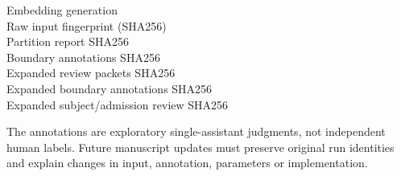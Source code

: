 \documentclass[11pt]{article}
\begin{document}
\begin{description}
\item[Embedding generation] 
\item[Raw input fingerprint (SHA256)] 
\item[Partition report SHA256] 
\item[Boundary annotations SHA256] 
\item[Expanded review packets SHA256] 
\item[Expanded boundary annotations SHA256] 
\item[Expanded subject/admission review SHA256] 
\end{description}
The annotations are exploratory single-assistant judgments, not independent
human labels. Future manuscript updates must preserve original run identities
and explain changes in input, annotation, parameters or implementation.
\end{document}
